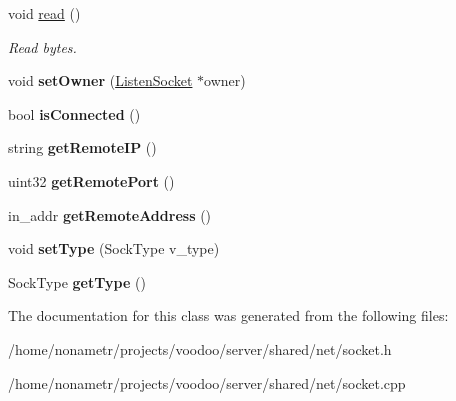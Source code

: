 \begin{DoxyCompactItemize}
\item 
\hypertarget{classSocket_a89fd9c15aa0807c03543d9ba79b2c4a7}{void \hyperlink{classSocket_a89fd9c15aa0807c03543d9ba79b2c4a7}{read} ()}\label{classSocket_a89fd9c15aa0807c03543d9ba79b2c4a7}

\begin{DoxyCompactList}\small\item\em \-Read bytes. \end{DoxyCompactList}\item 
\hypertarget{classSocket_a80de761d2722d0aea1b2b16867b30996}{void {\bfseries set\-Owner} (\hyperlink{classListenSocket}{\-Listen\-Socket} $\ast$owner)}\label{classSocket_a80de761d2722d0aea1b2b16867b30996}

\item 
\hypertarget{classSocket_a60c76a4c1e26192218d598b63cbb97b9}{bool {\bfseries is\-Connected} ()}\label{classSocket_a60c76a4c1e26192218d598b63cbb97b9}

\item 
\hypertarget{classSocket_ab54ab05b7088f40f9b9c9704d313cc68}{string {\bfseries get\-Remote\-I\-P} ()}\label{classSocket_ab54ab05b7088f40f9b9c9704d313cc68}

\item 
\hypertarget{classSocket_a00b515650b6ac528d997e1afe7787197}{uint32 {\bfseries get\-Remote\-Port} ()}\label{classSocket_a00b515650b6ac528d997e1afe7787197}

\item 
\hypertarget{classSocket_a7d9eae997fba47664fdc87227f3ed2e8}{in\-\_\-addr {\bfseries get\-Remote\-Address} ()}\label{classSocket_a7d9eae997fba47664fdc87227f3ed2e8}

\item 
\hypertarget{classSocket_aa0e1cac0aa5ca19e32e035bb2dce77a4}{void {\bfseries set\-Type} (\-Sock\-Type v\-\_\-type)}\label{classSocket_aa0e1cac0aa5ca19e32e035bb2dce77a4}

\item 
\hypertarget{classSocket_ae003b7c284944cfa8fe7662ebd82b666}{\-Sock\-Type {\bfseries get\-Type} ()}\label{classSocket_ae003b7c284944cfa8fe7662ebd82b666}

\end{DoxyCompactItemize}


\-The documentation for this class was generated from the following files\-:\begin{DoxyCompactItemize}
\item 
/home/nonametr/projects/voodoo/server/shared/net/socket.\-h\item 
/home/nonametr/projects/voodoo/server/shared/net/socket.\-cpp\end{DoxyCompactItemize}
